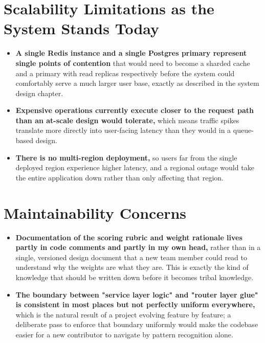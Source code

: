 \documentclass[11pt,a4paper]{report}
\begin{document}
\section{Scalability Limitations as the System Stands Today}

\begin{itemize}[leftmargin=*]
\item \textbf{A single Redis instance and a single Postgres primary represent single points of contention} that would need to become a sharded cache and a primary with read replicas respectively before the system could comfortably serve a much larger user base, exactly as described in the system design chapter.

\item \textbf{Expensive operations currently execute closer to the request path than an at-scale design would tolerate,} which means traffic spikes translate more directly into user-facing latency than they would in a queue-based design.

\item \textbf{There is no multi-region deployment,} so users far from the single deployed region experience higher latency, and a regional outage would take the entire application down rather than only affecting that region.
\end{itemize}

\section{Maintainability Concerns}

\begin{itemize}[leftmargin=*]
\item \textbf{Documentation of the scoring rubric and weight rationale lives partly in code comments and partly in my own head,} rather than in a single, versioned design document that a new team member could read to understand why the weights are what they are. This is exactly the kind of knowledge that should be written down before it becomes tribal knowledge.

\item \textbf{The boundary between "service layer logic" and "router layer glue" is consistent in most places but not perfectly uniform everywhere,} which is the natural result of a project evolving feature by feature; a deliberate pass to enforce that boundary uniformly would make the codebase easier for a new contributor to navigate by pattern recognition alone.
\end{itemize}
\end{document}
